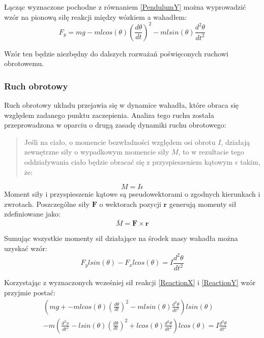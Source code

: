 \documentclass[12pt, oneside]{report}
\theoremstyle{definition}
\begin{document}
\newpage
Łącząc wyznaczone pochodne z równaniem \ref{PendulumY} można wyprowadzić wzór na pionową siłę reakcji między wózkiem a wahadłem:
\begin{equation} \label{ReactionY}
F_y = mg - mlcos(\theta) (\frac{d\theta}{dt})^2 - mlsin(\theta) \frac{d^2\theta}{dt^2}
\end{equation}

Wzór ten będzie niezbędny do dalszych rozważań poświęconych ruchowi obrotowemu.

\subsubsection{Ruch obrotowy}
Ruch obrotowy układu przejawia się w dynamice wahadła, które obraca się względem zadanego punktu zaczepienia.
Analiza tego ruchu została przeprowadzona w oparciu o drugą zasadę dynamiki ruchu obrotowego:
\begin{quote}
Jeśli na ciało, o momencie bezwładności względem osi obrotu $I$, działają zewnętrzne siły o wypadkowym momencie siły $M$, to w rezultacie tego oddziaływania ciało będzie obracać się z przyspieszeniem kątowym $\epsilon$ takim, że:
\end{quote}
\begin{equation}
M = I \epsilon
\end{equation}
Moment siły i przyspieszenie kątowe są pseudowektorami o zgodnych kierunkach i zwrotach. Poszczególne siły $\mathbf{F}$ o wektorach pozycji $\mathbf{r}$ generują momenty sił  zdefiniowane jako:
\begin{equation}
\overline{M} = \mathbf{F} \times \mathbf{r}
\end{equation}

Sumując wszystkie momenty sił działające na środek masy wahadła można uzyskać wzór:
\begin{equation}
F_y l sin(\theta) - F_x lcos(\theta) = I\frac{d^2\theta}{dt^2}
\end{equation}

Korzystając z wyznaczonych wcześniej sił reakcji \ref{ReactionX} i \ref{ReactionY} wzór przyjmie postać:
\begin{equation}
\begin{aligned}
&(mg + -mlcos(\theta) (\frac{d\theta}{dt})^2 - mlsin(\theta) \frac{d^2\theta}{dt^2})lsin(\theta)\\
&-m (\frac{d^2x}{dt^2} - lsin(\theta)(\frac{d\theta}{dt})^2 + lcos(\theta) \frac{d^2\theta}{dt^2})lcos(\theta) = I\frac{d^2\theta}{dt^2}
\end{aligned}
\end{equation}
\end{document}
